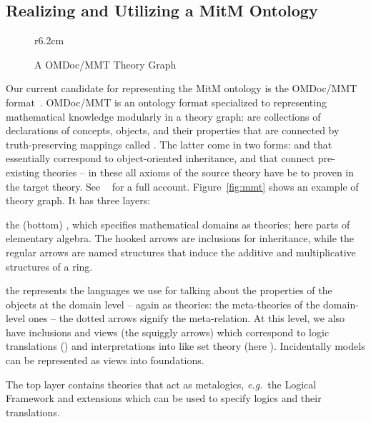 \subsection{Realizing and Utilizing a MitM Ontology}

\begin{wrapfigure}r{6.2cm}\centering\vspace*{-2em}
  \vspace*{-.5em}
  \caption{A OMDoc/MMT Theory Graph}\label{fig:mmt}\vspace*{-1em}
  \label{figure.omdoc.example}
\end{wrapfigure}
Our current candidate for representing the MitM ontology is the OMDoc/MMT
format~\cite{Kohlhase:OMDoc1.2,MMTSVN:on}. OMDoc/MMT is an ontology format specialized to
representing mathematical knowledge modularly in a theory graph:  are
collections of declarations of concepts, objects, and their properties that are connected
by truth-preserving mappings called . The latter come in two
forms:  and  that essentially correspond to
object-oriented inheritance, and  that connect pre-existing theories -- in
these all axioms of the source theory have be to proven in the target theory. See
~\cite{RabKoh:WSMSML13} for a full account. Figure~\ref{fig:mmt} shows an example of
theory graph. It has three layers:
\begin{compactenum}[\em i\rm)]
\item the (bottom) , which specifies mathematical domains as theories; here
  parts of elementary algebra. The hooked arrows are inclusions for inheritance, while the
  regular arrows are named structures that induce the additive and multiplicative
  structures of a ring.
\item the  represents the languages we use for talking about the
  properties of the objects at the domain level -- again as theories: the meta-theories of
  the domain-level ones -- the dotted arrows signify the meta-relation. At this level, we
  also have inclusions and views (the squiggly arrows) which correspond to logic
  translations () and interpretations into  like
  set theory (here ). Incidentally models can be represented as views into
  foundations.
\item The top layer contains theories that act as metalogics, \emph{e.g.}\ the Logical Framework
   and extensions which can be used to specify logics and their translations.
\end{compactenum}
